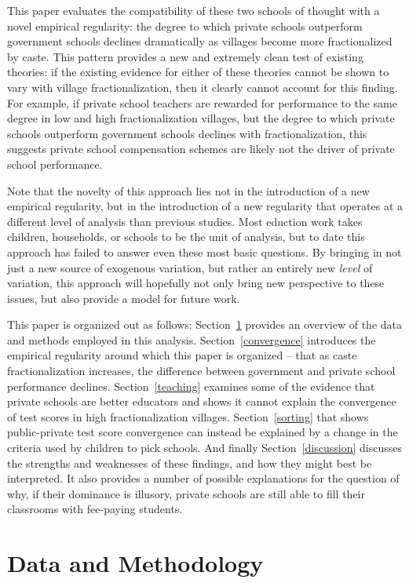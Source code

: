 \documentclass[12pt]{article}
\begin{document}
This paper evaluates the compatibility of these two schools of thought with a novel empirical regularity: the degree to which private schools outperform government schools declines dramatically as villages become more fractionalized by caste. This pattern provides a new and extremely clean test of existing theories: if the existing evidence for either of these theories cannot be shown to vary with village fractionalization, then it clearly cannot account for this finding. For example, if private school teachers are rewarded for performance to the same degree in low and high fractionalization villages, but the degree to which private schools outperform government schools declines with fractionalization, this suggests private school compensation schemes are likely not the driver of private school performance.

Note that the novelty of this approach lies not in the introduction of a new empirical regularity, but in the introduction of a new regularity that operates at a different level of analysis than previous studies. Most eduction work takes children, households, or schools to be the unit of analysis, but to date this approach has failed to answer even these most basic questions. By bringing in not just a new source of exogenous variation, but rather an entirely new \emph{level} of variation, this approach will hopefully not only bring new perspective to these issues, but also provide a model for future work. 

This paper is organized out as follows: Section~\ref{data} provides an overview of the data and methods employed in this analysis. Section~\ref{convergence} introduces the empirical regularity around which this paper is organized -- that as caste fractionalization increases, the difference between government and private school performance declines. Section~\ref{teaching} examines some of the evidence that private schools are better educators and shows it cannot explain the convergence of test scores in high fractionalization villages. Section~\ref{sorting} that shows public-private test score convergence can instead be explained by a change in the criteria used by children to pick schools. And finally Section~\ref{discussion} discusses the strengths and weaknesses of these findings, and how they might best be interpreted. It also provides a number of possible explanations for the question of why, if their dominance is illusory, private schools are still able to fill their classrooms with fee-paying students. 

\section{Data and Methodology}\label{data} %
\end{document}
